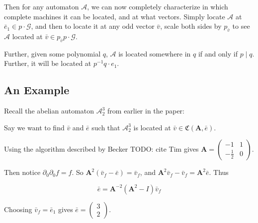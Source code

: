 \documentclass[12pt]{article}
\newcommand{\A}{\mathcal{A}}
\newcommand{\G}{\mathcal{G}}
\newcommand{\C}{\mathfrak{C}(\Am,\e)}
\newcommand{\2}{\textbf{2}}
\newcommand{\Am}{\textbf{A}}
\newcommand{\del}{\partial}
\renewcommand{\v}{\bar{v}}
\newcommand{\e}{\bar{e}}
\begin{document}
Then for any automaton $\A$, we can now completely characterize in
which complete machines it can be located, and at what vectors.
Simply locate $\A$ at $\e_1 \in p \cdot \G$, and then to locate it at
any odd vector $\v$, scale both sides by $p_{\v}$ to see $\A$ located at
$\v \in p_{\v} p \cdot \G$.

Further, given some polynomial $q$, $\A$ is located somewhere in $q$ 
if and only if $p \mid q$. Further, it will be located at 
$p^{-1}q \cdot e_1$.

\subsection{An Example}

Recall the abelian automaton $\A^3_2$ from earlier in the paper:

\begin{center}
\end{center}

Say we want to find $\v$ and $\e$ such that $\A^3_2$ is located at 
$\v \in \C$.

Using the algorithm described by Becker TODO: cite Tim gives 
$\Am = \begin{pmatrix} -1 & 1 \\ -\frac{1}{2} & 0 \end{pmatrix}$.

Then notice $\del_0 \del_0 f = f$.
So $\Am^2 (\v_f - \e) = \v_f$, and
$\Am^2 \v_f - \v_f = \Am^2 \e$. Thus

\[ \e = \Am^{-2} (\Am^2 - I) \v_f \]

Choosing $\v_f = \e_1$ gives $\e = \begin{pmatrix} 3 \\ 2 \end{pmatrix}$.
\end{document}
